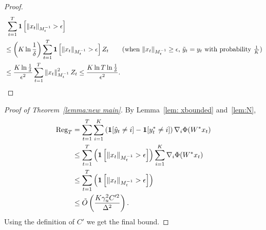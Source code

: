 \documentclass{article}
\newcommand{\Reg}{\text{\rm Reg}}
\newcommand{\one}{\boldsymbol{1}}
\newcommand{\norm}[1]{\left\|{#1}\right\|}
\begin{document}
\begin{proof}
\begin{align*}
    &~ \sum_{t=1}^T \one\left[\norm{x_t}_{M_t^{-1}}> \epsilon\right]\\
    &\leq \left(K\ln \frac{1}{\delta}\right)\sum_{t=1}^T \one\left[\norm{x_t}_{M_t^{-1}}> \epsilon\right]Z_t \tag{when $\|x_t\|_{M_t^{-1}}\geq \epsilon$, $\tilde{y}_t=y_t$ with probability $\frac{1}{K}$} \\
    & \leq \frac{K\ln \frac{1}{\delta}}{\epsilon^2}\sum_{t=1}^T \norm{x_t}_{M_t^{-1}}^2 Z_t \leq \frac{K\ln T\ln \frac{1}{\delta}}{\epsilon^2}. 
\end{align*}
\end{proof}

\begin{proof}[Proof of Theorem~\ref{lemma:new main}]
    By Lemma~\ref{lem: xbounded} and~\ref{lem:N}, 
    \begin{align*}
        \Reg_T &= \sum_{t=1}^T \sum_{i=1}^K \left(\one[\hat{y}_t\neq i] - \one[y^*_t\neq i]\right)\nabla_i\Phi(W^*x_t) \\
        & \leq \sum_{t=1}^T \left(\one\left[\|x_t\|_{M_t^{-1}}>\epsilon\right]\right) \sum_{i=1}^K \nabla_i\Phi(W^*x_t) \\
        & \leq \sum_{t=1}^T \left(\one\left[\|x_t\|_{M_t^{-1}}>\epsilon\right]\right) \\
        & \leq \tilde{O}\left( \frac{K\gamma_u^2C'^2}{\Delta^2} \right). 
    \end{align*}
    Using the definition of $C'$ we get the final bound. 
\end{proof}
\end{document}
